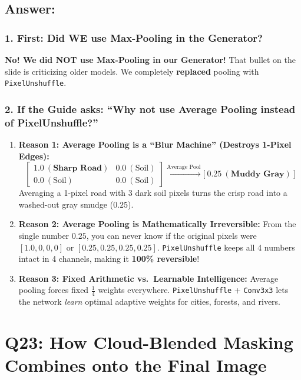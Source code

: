 \documentclass[11pt,a4paper]{article}
\begin{document}
\subsection*{Answer:}
\subsubsection*{1. First: Did WE use Max-Pooling in the Generator?}
\textbf{No! We did NOT use Max-Pooling in our Generator!} That bullet on the slide is criticizing older models. We completely \textbf{replaced} pooling with \texttt{PixelUnshuffle}.

\subsubsection*{2. If the Guide asks: ``Why not use Average Pooling instead of PixelUnshuffle?''}
\begin{enumerate}[leftmargin=1.5em]
    \item \textbf{Reason 1: Average Pooling is a ``Blur Machine'' (Destroys 1-Pixel Edges):}
    $$\begin{bmatrix} \mathbf{1.0\ (\text{Sharp Road})} & 0.0\ (\text{Soil}) \\ 0.0\ (\text{Soil}) & 0.0\ (\text{Soil}) \end{bmatrix} \xrightarrow{\text{Average Pool}} \Big[\ \mathbf{0.25\ (\text{Muddy Gray})}\ \Big]$$
    Averaging a 1-pixel road with 3 dark soil pixels turns the crisp road into a washed-out gray smudge ($0.25$).
    \item \textbf{Reason 2: Average Pooling is Mathematically Irreversible:} From the single number $0.25$, you can never know if the original pixels were $[1.0, 0, 0, 0]$ or $[0.25, 0.25, 0.25, 0.25]$. \texttt{PixelUnshuffle} keeps all 4 numbers intact in 4 channels, making it \textbf{100\% reversible}!
    \item \textbf{Reason 3: Fixed Arithmetic vs.\ Learnable Intelligence:} Average pooling forces fixed $\frac{1}{4}$ weights everywhere. \texttt{PixelUnshuffle} + \texttt{Conv3x3} lets the network \textit{learn} optimal adaptive weights for cities, forests, and rivers.
\end{enumerate}

\bigskip

\section{Q23: How Cloud-Blended Masking Combines onto the Final Image}
\end{document}
